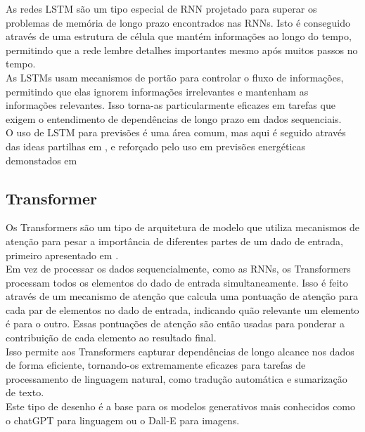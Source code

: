 As redes \gls{LSTM} são um tipo especial de RNN projetado para superar os problemas de memória de longo prazo encontrados nas RNNs. Isto é conseguido através de uma estrutura de célula que mantém informações ao longo do tempo, permitindo que a rede lembre detalhes importantes mesmo após muitos passos no tempo.\\
As \gls{LSTM}s usam mecanismos de portão para controlar o fluxo de informações, permitindo que elas ignorem informações irrelevantes e mantenham as informações relevantes. Isso torna-as particularmente eficazes em tarefas que exigem o entendimento de dependências de longo prazo em dados sequenciais.\\


O uso de \gls{LSTM} para previsões é uma área comum, mas aqui é seguido através das ideas partilhas em \cite{Hewamalage2021}, e reforçado pelo uso em previsões energéticas demonstados em \cite{Costa2022} \\


\subsection{Transformer\label{se:transformer_sec}}

Os Transformers são um tipo de arquitetura de modelo que utiliza mecanismos de atenção para pesar a importância de diferentes partes de um dado de entrada, primeiro apresentado em \cite{Vaswani2017}.\\
Em vez de processar os dados sequencialmente, como as RNNs, os Transformers processam todos os elementos do dado de entrada simultaneamente. Isso é feito através de um mecanismo de atenção que calcula uma pontuação de atenção para cada par de elementos no dado de entrada, indicando quão relevante um elemento é para o outro. Essas pontuações de atenção são então usadas para ponderar a contribuição de cada elemento ao resultado final. \\
Isso permite aos Transformers capturar dependências de longo alcance nos dados de forma eficiente, tornando-os extremamente eficazes para tarefas de processamento de linguagem natural, como tradução automática e sumarização de texto.\\
Este tipo de desenho é a base para os modelos generativos mais conhecidos como o chatGPT para linguagem ou o Dall-E para imagens.\\



